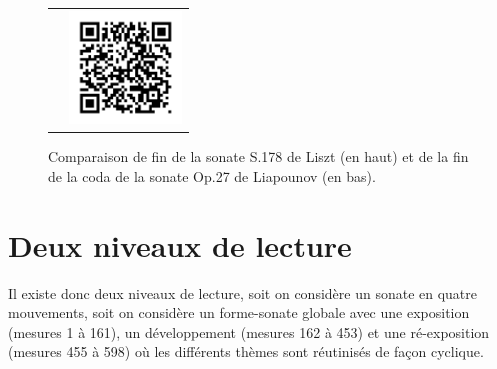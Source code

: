 \begin{figure}[!p]
\begin{bigcenter}
\begin{tabular}{lr}
      &
      \includegraphics[width=3cm, keepaspectratio]{sonate-qr.png}
    \end{tabular}
  \end{bigcenter}
  \caption{\label{sonate-fin}Comparaison de fin de la sonate S.178 de Liszt (en haut) et de la fin de la coda de la sonate Op.27 de Liapounov (en bas).}
\end{figure}

\section{Deux niveaux de lecture}

Il existe donc deux niveaux de lecture, soit on considère un sonate en quatre mouvements, soit on considère un forme-sonate globale avec une exposition (mesures 1 à 161), un développement (mesures 162 à 453) et une ré-exposition (mesures 455 à 598) où les différents thèmes sont réutinisés de façon cyclique.

